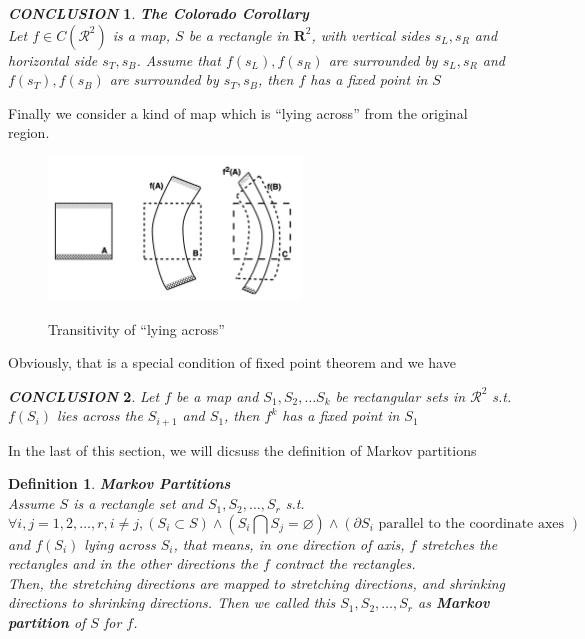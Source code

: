 \documentclass[12pt]{article}
\theoremstyle{plain}
\newtheorem{definition}{{\color{red}\textbf{Definition}}}[section]
\newtheorem{conclusion}{\textit{\textbf{CONCLUSION}}}[section]
\begin{document}
\begin{conclusion} \textbf{The Colorado Corollary}
\\\noindent Let $f \in C(\mathcal R^2)$ is a map, $S$ be a rectangle in $\mathbf R^2$, with vertical sides $s_L, s_R$ and horizontal side $s_T, s_B$. Assume that $f(s_L), f(s_R)$ are surrounded by $s_L, s_R$ and $f(s_T), f(s_B)$ are surrounded by $s_T, s_B$, then $f$ has a fixed point in $S$
\end{conclusion}

Finally we consider a kind of map which is ``lying across'' from the original region.

\begin{figure}[H]
\begin{center}
\includegraphics[width=0.6\textwidth]{figure/section5/lying-across.png} \\
\end{center}
\caption{Transitivity of ``lying across''}
\end{figure}

Obviously, that is a special condition of fixed point theorem and we have 
\begin{conclusion} Let $f$ be a map and $S_1, S_2, \ldots S_k$ be rectangular sets in $\mathcal R^2$ s.t. $f(S_i)$ lies across the $S_{i+1}$ and $S_1$, then $f^k$ has a fixed point in $S_1$
\end{conclusion}


In the last of this section, we will dicsuss the definition of Markov partitions
\newpage
\begin{definition}\textbf{Markov Partitions}
\\\noindent Assume $S$ is a rectangle set and $S_1, S_2, \ldots, S_r$ s.t. 
$$
\forall i, j = 1, 2, \ldots, r, i \neq j, \left(S_i \subset S\right) \land \left(S_i \bigcap S_j = \varnothing\right) \land \left( \partial S_i \text{ parallel to the coordinate axes }\right)
$$
and $f(S_i)$ lying across $S_i$, that means, in one direction of axis, $f$ stretches the rectangles and in the other directions the $f$ contract the rectangles. 
\\\noindent Then, the stretching directions are mapped to stretching directions, and shrinking directions to shrinking directions. Then we called this $S_1, S_2, \ldots, S_r$ as \textbf{Markov partition} of $S$ for $f$.
\end{definition}
\end{document}
